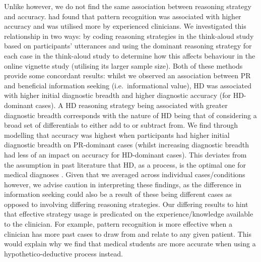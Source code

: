 \documentclass[a4paper, nobind]{templates/ociamthesis}
\begin{document}
Unlike \textcite{coderre_diagnostic_2003} however, we do not find the same association between reasoning strategy and accuracy. \textcite{coderre_diagnostic_2003} had found that pattern recognition was associated with higher accuracy and was utilised more by experienced clinicians. We investigated this relationship in two ways: by coding reasoning strategies in the think-aloud study based on participants' utterances and using the dominant reasoning strategy for each case in the think-aloud study to determine how this affects behaviour in the online vignette study (utilising its larger sample size). Both of these methods provide some concordant results: whilst we observed an association between PR and beneficial information seeking (i.e.~informational value), HD was associated with higher initial diagnostic breadth and higher diagnostic accuracy (for HD-dominant cases). A HD reasoning strategy being associated with greater diagnostic breadth corresponds with the nature of HD being that of considering a broad set of differentials to either add to or subtract from. We find through modelling that accuracy was highest when participants had higher initial diagnostic breadth on PR-dominant cases (whilst increasing diagnostic breadth had less of an impact on accuracy for HD-dominant cases). This deviates from the assumption in past literature that HD, as a process, is the optimal one for medical diagnoses \autocite{kuipers_causal_1984,higgs_clinical_2019}. Given that we averaged across individual cases/conditions however, we advise caution in interpreting these findings, as the difference in information seeking could also be a result of these being different cases as opposed to involving differing reasoning strategies. Our differing results to \textcite{coderre_diagnostic_2003} hint that effective strategy usage is predicated on the experience/knowledge available to the clinician. For example, pattern recognition is more effective when a clinician has more past cases to draw from and relate to any given patient. This would explain why we find that medical students are more accurate when using a hypothetico-deductive process instead.\\
\end{document}
